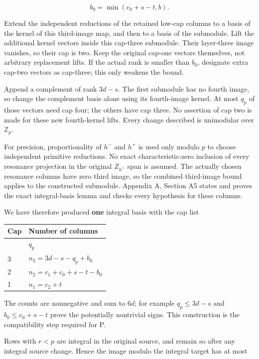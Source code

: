 \documentclass[11pt,a4paper]{article}
\begin{document}
\[
b_0=\min(c_0+s-t,b).
\]

Extend the independent reductions of the retained low-cap columns to a basis of the kernel of this third-image map, and then to a basis of the submodule. Lift the additional kernel vectors inside this cap-three submodule. Their layer-three image vanishes, so their cap is two. Keep the original cap-one vectors themselves, not arbitrary replacement lifts. If the actual rank is smaller than \(b_{0}\), designate extra cap-two vectors as cap-three; this only weakens the bound.

Append a complement of rank \(3d-s\). The first submodule has no fourth image, so change the complement basis alone using its fourth-image kernel. At most \(q_p\) of those vectors need cap four; the others have cap three. No assertion of cap two is made for these new fourth-kernel lifts. Every change described is unimodular over \(\mathbb{Z}_p\).

For precision, proportionality of \(h^{-}\) and \(h^{+}\) is used only modulo \(p\) to choose independent primitive reductions. No exact characteristic-zero inclusion of every resonance projection in the original \(Z_{h^{+}}\) span is assumed. The actually chosen resonance columns have zero third image, so the combined third-image bound applies to the constructed submodule. Appendix A, Section A5 states and proves the exact integral-basis lemma and checks every hypothesis for these columns.

We have therefore produced \textbf{one} integral basis with the cap list

\begin{longtable}[]{@{}ll@{}}
\toprule\noalign{}
Cap & Number of columns \\
\midrule\noalign{}
\endhead
\bottomrule\noalign{}
\endlastfoot
4 & \(q_p\) \\
3 & \(n_{3}=3d-s-q_p+b_{0}\) \\
2 & \(n_{2}=c_{1}+c_{0}+s-t-b_{0}\) \\
1 & \(n_{1}=c_{2}+t\) \\
\end{longtable}

The counts are nonnegative and sum to \(6d\); for example \(q_p≤3d-s\) and \(b_{0}≤c_{0}+s-t\) prove the potentially nontrivial signs. This construction is the compatibility step required for P.

Rows with \(r<p\) are integral in the original source, and remain so after any integral source change. Hence the image modulo the integral target has at most
\end{document}
